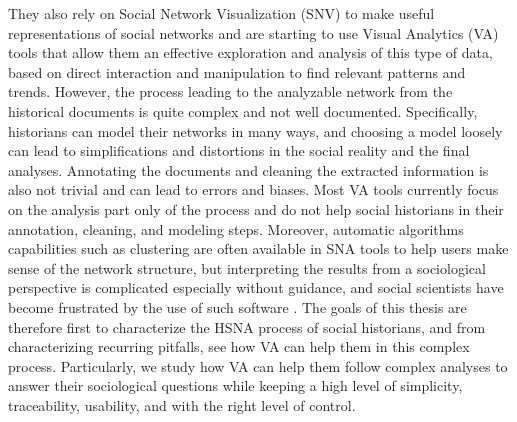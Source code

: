 They also rely on Social Network Visualization (SNV) to make useful representations of social networks and are starting to use Visual Analytics (VA) tools that allow them an effective exploration and analysis of this type of data, based on direct interaction and manipulation to find relevant patterns and trends.
However, the process leading to the analyzable network from the historical documents is quite complex and not well documented.
Specifically, historians can model their networks in many ways, and choosing a model loosely can lead to simplifications and distortions in the social reality and the final analyses.
Annotating the documents and cleaning the extracted information is also not trivial and can lead to errors and biases.
Most VA tools currently focus on the analysis part only of the process and do not help social historians in their annotation, cleaning, and modeling steps.
Moreover, automatic algorithms capabilities such as clustering are often available in SNA tools to help users make sense of the network structure, but interpreting the results from a sociological perspective is complicated especially without guidance, and social scientists have become frustrated by the use of such software \cite{lemercierBackSourcesPracticing2021}.
The goals of this thesis are therefore first to characterize the HSNA process of social historians, and from characterizing recurring pitfalls, see how VA can help them in this complex process.
Particularly, we study how VA can help them follow complex analyses to answer their sociological questions while keeping a high level of simplicity, traceability, usability, and with the right level of control.

%

